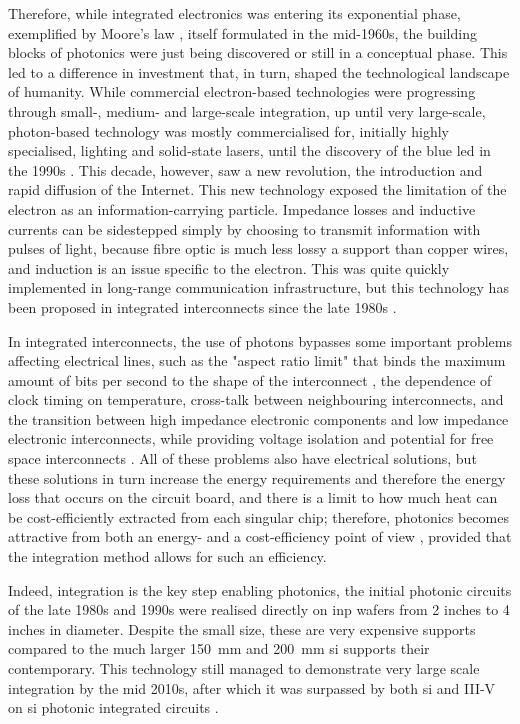 Therefore, while integrated electronics was entering its exponential phase, exemplified by Moore's law \cite{Moore1965}, itself formulated in the mid-1960s, the building blocks of photonics were just being discovered or still in a conceptual phase. This led to a difference in investment that, in turn, shaped the technological landscape of humanity. While commercial electron-based technologies were progressing through small-, medium- and large-scale integration, up until very large-scale, photon-based technology was mostly commercialised for, initially highly specialised, lighting and solid-state lasers, until the discovery of the blue \acs{led} in the 1990s \cite{Nakamura1994}. This decade, however, saw a new revolution, the introduction and rapid diffusion of the Internet. This new technology exposed the limitation of the electron as an information-carrying particle. Impedance losses and inductive currents can be sidestepped simply by choosing to transmit information with pulses of light, because fibre optic is much less lossy a support than copper wires, and induction is an issue specific to the electron. This was quite quickly implemented in long-range communication infrastructure, but this technology has been proposed in integrated interconnects since the late 1980s \cite{Miller1989}.

In integrated interconnects, the use of photons bypasses some important problems affecting electrical lines, such as the "aspect ratio limit" that binds the maximum amount of bits per second to the shape of the interconnect \cite{Miller1997}, the dependence of clock timing on temperature, cross-talk between neighbouring interconnects, and the transition between high impedance electronic components and low impedance electronic interconnects, while providing voltage isolation and potential for free space interconnects \cite{Miller1997_reasons}. All of these problems also have electrical solutions, but these solutions in turn increase the energy requirements and therefore the energy loss that occurs on the circuit board, and there is a limit to how much heat can be cost-efficiently extracted from each singular chip; therefore, photonics becomes attractive from both an energy- and a cost-efficiency point of view \cite{Miller2009}, provided that the integration method allows for such an efficiency. 

Indeed, integration is the key step enabling photonics, the initial photonic circuits of the late 1980s and 1990s were realised directly on \acf{inp} wafers from \num{2} inches to \num{4} inches in diameter. Despite the small size, these are very expensive supports compared to the much larger \qty{150}{\milli\metre} and \qty{200}{\milli\metre} \acl{si} supports their contemporary. This technology still managed to demonstrate very large scale integration by the mid 2010s, after which it was surpassed by both \acl{si} and III-V on \acl{si} photonic integrated circuits \cite{Shekhar2024, Margalit2021}.

